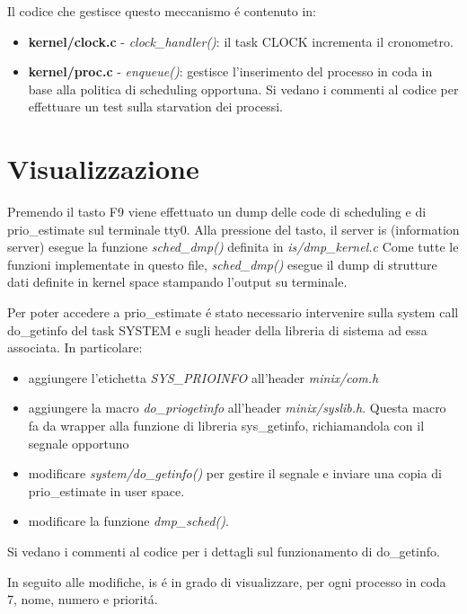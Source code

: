 \documentclass[a4paper,12pt]{report}
\begin{document}
Il codice che gestisce questo meccanismo \'e contenuto in:

\begin{itemize}
\item \textbf{kernel/clock.c} - \textit{clock\_handler()}: il task CLOCK
incrementa il cronometro.
\item \textbf{kernel/proc.c} - \textit{enqueue()}: gestisce l'inserimento del
processo in coda in base alla politica di scheduling opportuna. Si vedano i
commenti al codice per effettuare un test sulla starvation dei processi.
\end{itemize}

\section{Visualizzazione}
Premendo il tasto F9 viene effettuato un dump delle
code di scheduling e di prio\_estimate sul terminale tty0.
Alla pressione del tasto, il server is (information server) esegue la
funzione \textit{sched\_dmp()} definita in \textit{is/dmp\_kernel.c}
Come tutte le funzioni implementate in questo file, \textit{sched\_dmp()}
esegue il dump di strutture dati definite in kernel space stampando l'output
su terminale.

Per poter accedere a prio\_estimate \'e stato necessario intervenire 
sulla system call do\_getinfo del task SYSTEM e sugli header della libreria di sistema
ad essa associata.
In particolare:
\begin{itemize}
\item aggiungere l'etichetta \textit{SYS\_PRIOINFO} all'header \textit{minix/com.h}
\item aggiungere la macro \textit{do\_priogetinfo} all'header \textit{minix/syslib.h}. Questa
macro fa da wrapper alla funzione di libreria sys\_getinfo, richiamandola
con il segnale opportuno
\item modificare \textit{system/do\_getinfo()} per gestire il segnale e inviare una
copia di prio\_estimate in user space.
\item modificare la funzione \textit{dmp\_sched()}.
\end{itemize}

Si vedano i commenti al codice per i dettagli sul funzionamento di
do\_getinfo.

In seguito alle modifiche, is \'e in grado di visualizzare, per ogni
processo in coda 7, nome, numero e priorit\'a.
\end{document}
